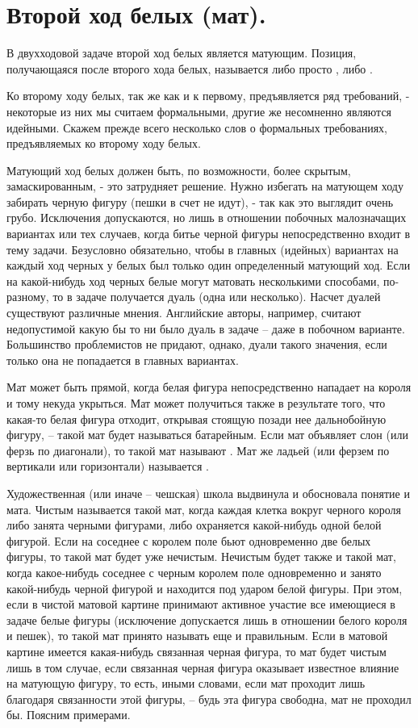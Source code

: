 \chapter{Второй ход белых (мат).}

В двухходовой задаче второй ход белых является матующим. Позиция, получающаяся после второго хода белых, называется либо просто , либо .

Ко второму ходу белых, так же как и к первому, предъявляется ряд требований, - некоторые из них мы считаем формальными, другие же несомненно являются идейными. Скажем прежде всего несколько слов о формальных требованиях, предъявляемых ко второму ходу белых.

Матующий ход белых должен быть, по возможности, более скрытым, замаскированным, - это затрудняет решение. Нужно избегать на матующем ходу забирать черную фигуру (пешки в счет не идут), - так как это выглядит очень грубо. Исключения допускаются, но лишь в отношении побочных малозначащих вариантах или тех случаев, когда битье черной фигуры непосредственно входит в тему задачи. Безусловно обязательно, чтобы в главных (идейных) вариантах на каждый ход черных у белых был только один определенный матующий ход. Если на какой-нибудь ход черных белые могут матовать несколькими способами, по-разному, то в задаче получается дуаль (одна или несколько). Насчет дуалей существуют различные мнения. Английские авторы, например, считают недопустимой какую бы то ни было дуаль в задаче – даже в побочном варианте. Большинство проблемистов не придают, однако, дуали такого значения, если только она не попадается в главных вариантах.

Мат может быть прямой, когда белая фигура непосредственно нападает на короля и тому некуда укрыться. Мат может получиться также в результате того, что какая-то белая фигура отходит, открывая стоящую позади нее дальнобойную фигуру, -- такой мат будет называться батарейным. Если мат объявляет слон (или ферзь по диагонали), то такой мат называют . Мат же ладьей (или ферзем по вертикали или горизонтали) называется .

Художественная (или иначе -- чешская) школа выдвинула и обосновала понятие  и  мата. Чистым называется такой мат, когда каждая клетка вокруг черного короля либо занята черными фигурами, либо охраняется какой-нибудь одной белой фигурой. Если на соседнее с королем поле бьют одновременно две белых фигуры, то такой мат будет уже нечистым. Нечистым будет также и такой мат, когда какое-нибудь соседнее с черным королем поле одновременно и занято какой-нибудь черной фигурой и находится под ударом белой фигуры. При этом, если в чистой матовой картине принимают активное участие все имеющиеся в задаче белые фигуры (исключение допускается лишь в отношении белого короля и пешек), то такой мат принято называть еще и правильным. Если в матовой картине имеется какая-нибудь связанная черная фигура, то мат будет чистым лишь в том случае, если связанная черная фигура оказывает известное влияние на матующую фигуру, то есть, иными словами, если мат проходит лишь благодаря связанности этой фигуры, -- будь эта фигура свободна, мат не проходил бы. Поясним примерами.

